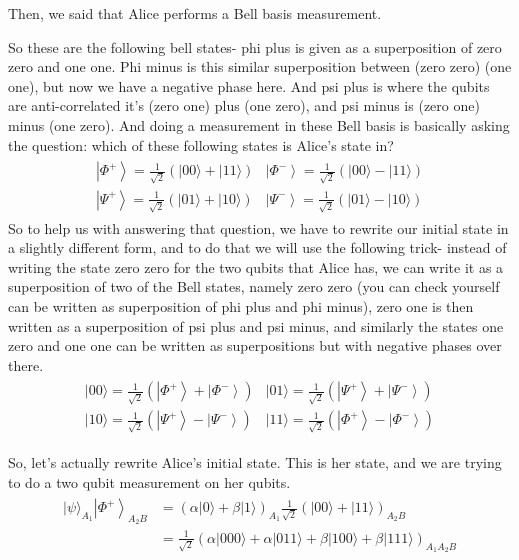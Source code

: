 Then, we said that Alice performs a Bell basis measurement.

So these are the following bell states- phi plus is given as a superposition of zero zero and one one. Phi minus is this similar superposition between (zero zero) (one one), but now we have a negative phase here. And psi plus is where the qubits are anti-correlated it's (zero one) plus (one zero), and psi minus is (zero one) minus (one zero). And doing a measurement in these Bell basis is basically asking the question: which of these following states is Alice's state in? 
\begin{align}
    \begin{array}{ll}
\left|\Phi^{+}\right\rangle=\frac{1}{\sqrt{2}}(|00\rangle+|11\rangle) & \left|\Phi^{-}\right\rangle=\frac{1}{\sqrt{2}}(|00\rangle-|11\rangle) \\
\left|\Psi^{+}\right\rangle=\frac{1}{\sqrt{2}}(|01\rangle+|10\rangle) & \left|\Psi^{-}\right\rangle=\frac{1}{\sqrt{2}}(|01\rangle-|10\rangle)
\end{array}
\end{align}
So to help us with answering that question, we have to rewrite our initial state in a slightly different form, and to do that we will use the following trick- instead of writing the state zero zero for the two qubits that Alice has, we can write it as a superposition of two of the Bell states, namely zero zero (you can check yourself can be written as superposition of phi plus and phi minus), zero one is then written as a superposition of psi plus and psi minus, and similarly the states one zero and one one can be written as superpositions but with negative phases over there.
\begin{align}
    \begin{array}{ll}
|00\rangle=\frac{1}{\sqrt{2}}\left(\left|\Phi^{+}\right\rangle+\left|\Phi^{-}\right\rangle\right) & |01\rangle=\frac{1}{\sqrt{2}}\left(\left|\Psi^{+}\right\rangle+\left|\Psi^{-}\right\rangle\right) \\
|10\rangle=\frac{1}{\sqrt{2}}\left(\left|\Psi^{+}\right\rangle-\left|\Psi^{-}\right\rangle\right) & |11\rangle=\frac{1}{\sqrt{2}}\left(\left|\Phi^{+}\right\rangle-\left|\Phi^{-}\right\rangle\right)
\end{array}
\end{align}

So, let's actually rewrite Alice's initial state. This is her state, and we are trying to do a two qubit measurement on her qubits.
\begin{align}
    \begin{aligned}
|\psi\rangle_{A_{1}}\left|\Phi^{+}\right\rangle_{A_{2} B} &=(\alpha|0\rangle+\beta|1\rangle)_{A_{1}} \frac{1}{\sqrt{2}}(|00\rangle+|11\rangle)_{A_{2} B} \\
&=\frac{1}{\sqrt{2}}(\alpha|000\rangle+\alpha|011\rangle+\beta|100\rangle+\beta|111\rangle)_{A_{1} A_{2} B}
\end{aligned}
\end{align}

